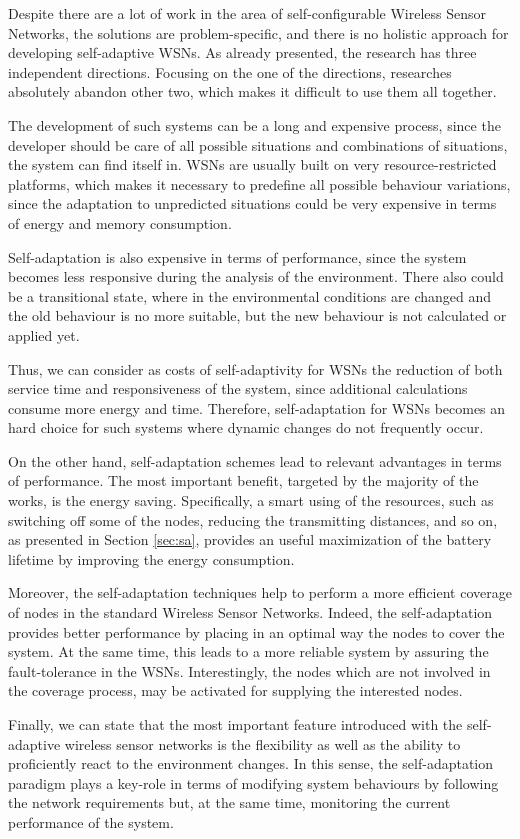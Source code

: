 
Despite there are a lot of work in the area of self-configurable Wireless Sensor
Networks, the solutions are problem-specific, and there is no holistic approach
for developing self-adaptive WSNs. As already presented, the research has three
independent directions. Focusing on the one of the directions, researches
absolutely abandon other two, which makes it difficult to use them all together.

The development of such systems can be a long and expensive process, since the
developer should be care of all possible situations and combinations of
situations, the system can find itself in. WSNs are usually built on very
resource-restricted platforms, which makes it necessary to predefine all
possible behaviour variations, since the adaptation to unpredicted situations
could be very expensive in terms of energy and memory consumption.

Self-adaptation is also expensive in terms of performance, since the system
becomes less responsive during the analysis of the environment. There also could
be a transitional state, where in the environmental conditions are changed and
the old behaviour is no more suitable, but the new behaviour is not calculated
or applied yet.

Thus, we can consider as
costs of self-adaptivity for WSNs the reduction of both service time and
responsiveness of the system, since additional calculations consume more energy
and time. Therefore, self-adaptation for WSNs becomes an hard choice for such
systems where dynamic changes do not frequently occur. 

On the other hand, self-adaptation schemes lead to relevant advantages in terms
of performance. The most important benefit, targeted by the majority of the
works, is the energy saving. Specifically, a smart using of the resources, such
as switching off some of the nodes, reducing the transmitting distances, and so
on, as presented in Section \ref{sec:sa}, provides an useful maximization of the
battery lifetime by improving the energy consumption. 

Moreover, the self-adaptation techniques help to perform a more efficient
coverage of nodes in the standard Wireless Sensor Networks. Indeed, the
self-adaptation provides better performance by placing in an optimal way the
nodes to cover the system. At the same time, this leads to a more reliable
system by assuring the fault-tolerance in the WSNs. Interestingly, the nodes
which are not involved in the coverage process, may be activated for supplying
the interested nodes.

Finally, we can state that the most important feature introduced with the
self-adaptive wireless sensor networks is the flexibility as well as the ability
to proficiently react to the environment changes. In this sense, the
self-adaptation paradigm plays a key-role in terms of modifying system
behaviours by following the  network requirements but, at the same time,
monitoring the current performance of the system.
